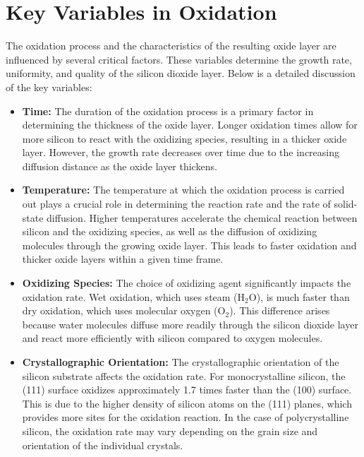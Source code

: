 \documentclass{report}
\begin{document}
\section{Key Variables in Oxidation}

The oxidation process and the characteristics of the resulting oxide layer are influenced by several critical factors. These variables determine the growth rate, uniformity, and quality of the silicon dioxide layer. Below is a detailed discussion of the key variables:

\begin{itemize}
    \item \textbf{Time:} 
    The duration of the oxidation process is a primary factor in determining the thickness of the oxide layer. Longer oxidation times allow for more silicon to react with the oxidizing species, resulting in a thicker oxide layer. However, the growth rate decreases over time due to the increasing diffusion distance as the oxide layer thickens.

    \item \textbf{Temperature:} 
    The temperature at which the oxidation process is carried out plays a crucial role in determining the reaction rate and the rate of solid-state diffusion. Higher temperatures accelerate the chemical reaction between silicon and the oxidizing species, as well as the diffusion of oxidizing molecules through the growing oxide layer. This leads to faster oxidation and thicker oxide layers within a given time frame.

    \item \textbf{Oxidizing Species:} 
    The choice of oxidizing agent significantly impacts the oxidation rate. Wet oxidation, which uses steam ($\text{H}_2\text{O}$), is much faster than dry oxidation, which uses molecular oxygen ($\text{O}_2$). This difference arises because water molecules diffuse more readily through the silicon dioxide layer and react more efficiently with silicon compared to oxygen molecules.

    \item \textbf{Crystallographic Orientation:} 
    The crystallographic orientation of the silicon substrate affects the oxidation rate. For monocrystalline silicon, the (111) surface oxidizes approximately 1.7 times faster than the (100) surface. This is due to the higher density of silicon atoms on the (111) planes, which provides more sites for the oxidation reaction. In the case of polycrystalline silicon, the oxidation rate may vary depending on the grain size and orientation of the individual crystals.


\end{itemize}
\end{document}
